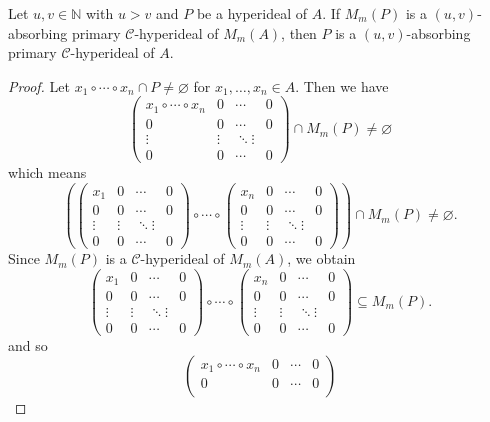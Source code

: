 \documentclass[10pt,a4paper]{amsart}
\begin{document}
\begin{theorem} \label{8} 
Let $u,v \in \mathbb{N}$ with $u >v$ and $P$ be a hyperideal of $A$. If $M_m(P)$ is a $(u,v)$-absorbing primary $\mathcal{C}$-hyperideal of $M_m(A)$, then $P$ is a $(u,v)$-absorbing primary $\mathcal{C}$-hyperideal of $A$. 
\end{theorem}

\begin{proof}
Let $x_1 \circ \cdots \circ x_n \cap P \neq \varnothing$ for $x_1,\ldots,x_n \in A$. Then we have 
\[\begin{pmatrix}
x_1 \circ \cdots \circ x_n & 0 & \cdots & 0 \\
0 & 0 & \cdots & 0 \\
\vdots & \vdots & \ddots \vdots \\
0 & 0 & \cdots & 0 
\end{pmatrix}
\cap M_m(P) \neq \varnothing\]
which means 
\[(\begin{pmatrix}
x_1 & 0 & \cdots & 0\\
0 & 0 & \cdots & 0\\
\vdots & \vdots & \ddots \vdots\\
0 & 0 & \cdots & 0
\end{pmatrix}
\circ \cdots \circ
\begin{pmatrix}
x_n & 0 & \cdots & 0\\
0 & 0 & \cdots & 0\\
\vdots & \vdots & \ddots \vdots\\
0 & 0 & \cdots & 0
\end{pmatrix}) \cap M_m(P) \neq \varnothing.
\]
Since $M_m(P)$ is a $\mathcal{C}$-hyperideal of $M_m(A)$, we obtain \[\begin{pmatrix}
x_1 & 0 & \cdots & 0\\
0 & 0 & \cdots & 0\\
\vdots & \vdots & \ddots \vdots\\
0 & 0 & \cdots & 0
\end{pmatrix}
\circ \cdots \circ
\begin{pmatrix}
x_n & 0 & \cdots & 0\\
0 & 0 & \cdots & 0\\
\vdots & \vdots & \ddots \vdots\\
0 & 0 & \cdots & 0
\end{pmatrix} \subseteq M_m(P).
\]
and so 
\[\begin{pmatrix}
x_1 \circ \cdots \circ x_n & 0 & \cdots & 0 \\
0 & 0 & \cdots & 0 \\

\end{pmatrix}\]
\end{proof}
\end{document}
